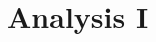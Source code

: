 \documentclass[
../../Mathe2Zusammenfassung2024.tex,
]
{subfiles}
\begin{document}
\section{Analysis I}
\end{document}
